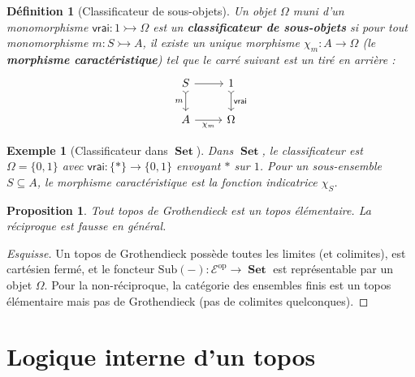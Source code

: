 \documentclass[a4paper,12pt]{book}
\DeclareMathOperator{\Set}{\mathbf{Set}}
\newcommand{\op}{\mathrm{op}}
\newtheorem{proposition}[theoreme]{Proposition}
\newtheorem{definition}[theoreme]{Définition}
\newtheorem{exemple}[theoreme]{Exemple}
\begin{document}
\begin{definition}[Classificateur de sous-objets]\label{def:classificateur}
Un objet $\Omega$ muni d'un monomorphisme
$\mathsf{vrai} \colon 1 \rightarrowtail \Omega$
est un \textbf{classificateur de sous-objets} si pour tout
monomorphisme $m \colon S \rightarrowtail A$, il existe un unique
morphisme $\chi_m \colon A \to \Omega$ (le \textbf{morphisme
caractéristique}) tel que le carré suivant est un tiré en arrière :
\[
\begin{tikzcd}
S \arrow[r] \arrow[d, tail, "m"'] & 1 \arrow[d, tail, "\mathsf{vrai}"] \\
A \arrow[r, "\chi_m"'] & \Omega
\end{tikzcd}
\]
\end{definition}

\begin{exemple}[Classificateur dans $\Set$]\label{ex:omega-set}
Dans $\Set$, le classificateur est $\Omega = \{0, 1\}$ avec
$\mathsf{vrai} \colon \{*\} \to \{0,1\}$ envoyant $*$ sur $1$.
Pour un sous-ensemble $S \subseteq A$, le morphisme caractéristique
est la fonction indicatrice $\chi_S$.
\end{exemple}

\begin{proposition}\label{prop:topos-groth-elementaire}
Tout topos de Grothendieck est un topos élémentaire.  La réciproque
est fausse en général.
\end{proposition}

\begin{proof}[Esquisse]
Un topos de Grothendieck possède toutes les limites (et colimites),
est cartésien fermé, et le foncteur $\mathrm{Sub}(-) \colon
\mathcal{E}^\op \to \Set$ est représentable par un objet $\Omega$.
Pour la non-réciproque, la catégorie des ensembles finis est un
topos élémentaire mais pas de Grothendieck (pas de colimites
quelconques).
\end{proof}

\section{Logique interne d'un topos}\label{sec:logique-interne}
\end{document}
